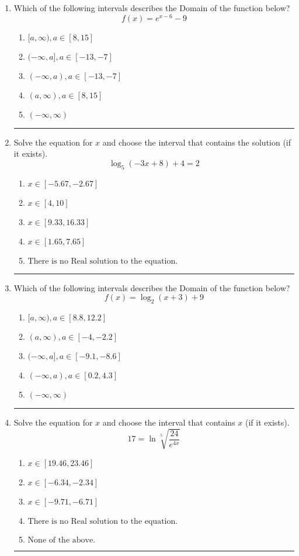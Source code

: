 \documentclass[14pt]{extbook}
\newcommand{\litem}[1]{\item#1\hspace*{-1cm}\rule{\textwidth}{0.4pt}}
\begin{document}
\begin{enumerate}
{\begin{enumerate}[label=\Alph*.]
\end{enumerate} }
\litem{
Which of the following intervals describes the Domain of the function below?\[ f(x) = e^{x-6}-9 \]\begin{enumerate}[label=\Alph*.]
\item \( [a, \infty), a \in [8, 15] \)
\item \( (-\infty, a], a \in [-13, -7] \)
\item \( (-\infty, a), a \in [-13, -7] \)
\item \( (a, \infty), a \in [8, 15] \)
\item \( (-\infty, \infty) \)

\end{enumerate} }
\litem{
Solve the equation for $x$ and choose the interval that contains the solution (if it exists).\[ \log_{5}{(-3x+8)}+4 = 2 \]\begin{enumerate}[label=\Alph*.]
\item \( x \in [-5.67, -2.67] \)
\item \( x \in [4, 10] \)
\item \( x \in [9.33, 16.33] \)
\item \( x \in [1.65, 7.65] \)
\item \( \text{There is no Real solution to the equation.} \)

\end{enumerate} }
\litem{
Which of the following intervals describes the Domain of the function below?\[ f(x) = \log_2{(x+3)}+9 \]\begin{enumerate}[label=\Alph*.]
\item \( [a, \infty), a \in [8.8, 12.2] \)
\item \( (a, \infty), a \in [-4, -2.2] \)
\item \( (-\infty, a], a \in [-9.1, -8.6] \)
\item \( (-\infty, a), a \in [0.2, 4.3] \)
\item \( (-\infty, \infty) \)

\end{enumerate} }
\litem{
 Solve the equation for $x$ and choose the interval that contains $x$ (if it exists).\[  17 = \ln{\sqrt[5]{\frac{24}{e^{4x}}}} \]\begin{enumerate}[label=\Alph*.]
\item \( x \in [19.46, 23.46] \)
\item \( x \in [-6.34, -2.34] \)
\item \( x \in [-9.71, -6.71] \)
\item \( \text{There is no Real solution to the equation.} \)
\item \( \text{None of the above.} \)


\end{enumerate}}
\end{enumerate}
\end{document}

